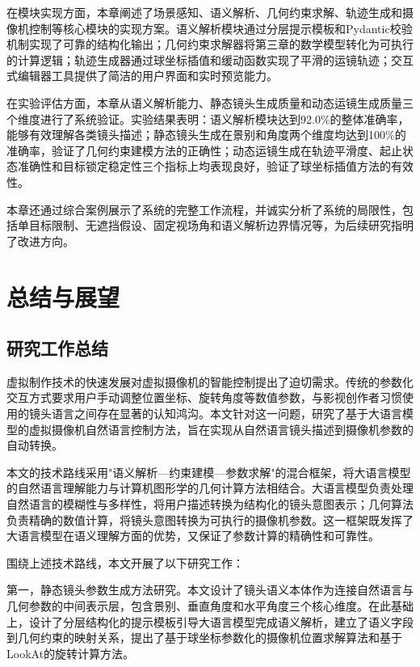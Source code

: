 在模块实现方面，本章阐述了场景感知、语义解析、几何约束求解、轨迹生成和摄像机控制等核心模块的实现方案。语义解析模块通过分层提示模板和Pydantic校验机制实现了可靠的结构化输出；几何约束求解器将第三章的数学模型转化为可执行的计算逻辑；轨迹生成器通过球坐标插值和缓动函数实现了平滑的运镜轨迹；交互式编辑器工具提供了简洁的用户界面和实时预览能力。

在实验评估方面，本章从语义解析能力、静态镜头生成质量和动态运镜生成质量三个维度进行了系统验证。实验结果表明：语义解析模块达到92.0\%的整体准确率，能够有效理解各类镜头描述；静态镜头生成在景别和角度两个维度均达到100\%的准确率，验证了几何约束建模方法的正确性；动态运镜生成在轨迹平滑度、起止状态准确性和目标锁定稳定性三个指标上均表现良好，验证了球坐标插值方法的有效性。

本章还通过综合案例展示了系统的完整工作流程，并诚实分析了系统的局限性，包括单目标限制、无遮挡假设、固定视场角和语义解析边界情况等，为后续研究指明了改进方向。


\chapter{总结与展望}
\label{chap:conclusion}

\section{研究工作总结}

虚拟制作技术的快速发展对虚拟摄像机的智能控制提出了迫切需求。传统的参数化交互方式要求用户手动调整位置坐标、旋转角度等数值参数，与影视创作者习惯使用的镜头语言之间存在显著的认知鸿沟。本文针对这一问题，研究了基于大语言模型的虚拟摄像机自然语言控制方法，旨在实现从自然语言镜头描述到摄像机参数的自动转换。

本文的技术路线采用"语义解析—约束建模—参数求解"的混合框架，将大语言模型的自然语言理解能力与计算机图形学的几何计算方法相结合。大语言模型负责处理自然语言的模糊性与多样性，将用户描述转换为结构化的镜头意图表示；几何算法负责精确的数值计算，将镜头意图转换为可执行的摄像机参数。这一框架既发挥了大语言模型在语义理解方面的优势，又保证了参数计算的精确性和可靠性。

围绕上述技术路线，本文开展了以下研究工作：

第一，静态镜头参数生成方法研究。本文设计了镜头语义本体作为连接自然语言与几何参数的中间表示层，包含景别、垂直角度和水平角度三个核心维度。在此基础上，设计了分层结构化的提示模板引导大语言模型完成语义解析，建立了语义字段到几何约束的映射关系，提出了基于球坐标参数化的摄像机位置求解算法和基于LookAt的旋转计算方法。

